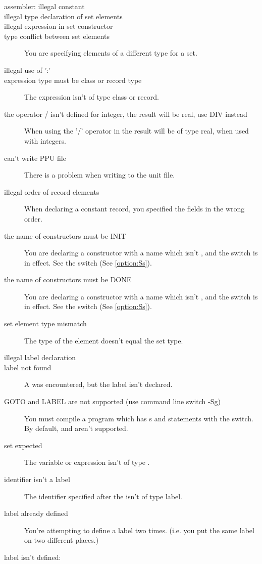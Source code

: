 \documentclass{report}
\newcommand{\seeo}[1]{See \ref{option:#1}}
\begin{document}
\begin{description}
\item [assembler: illegal constant]
\item [illegal type declaration of set elements]
\item [illegal expression in set constructor]
\item [type conflict between set elements]
You are specifying elements of a different type for a set.
\item [illegal use of ':']
\item [expression type must be class or record type]
The expression isn't of type class or record.
\item [the operator / isn't defined for integer, the result will be real, use DIV instead]
When using the '/' operator in \fpk the result will be of type real, when
used with integers.
\item [can't write PPU file]
There is a problem when writing to the unit file.
\item [illegal order of record elements]
When declaring a constant record, you specified the fields in the wrong
order.
\item [the name of constructors must be INIT]
You are declaring a constructor with a name which isn't , and the
 switch is in effect. See the  switch (\seeo{Ss}). 
\item [the name of constructors must be DONE]
You are declaring a constructor with a name which isn't , and the
 switch is in effect. See the  switch (\seeo{Ss}). 
\item [set element type mismatch]
The type of the element doesn't equal the set type.
\item [illegal label declaration]
\item [label not found]
A  was encountered, but the label isn't declared. 
\item [GOTO and LABEL are not supported (use command line switch -Sg)]
You must compile a program which has s and  statements 
with the   switch. By default,  and  aren't
supported.
\item [set expected]
The variable or expression isn't of type .
\item [identifier isn't a label]
The identifier specified after the  isn't of type label.
\item [label already defined]
You're attempting to define a label two times. (i.e. you put the same label
on two different places.)
\item [label isn't defined:]

\end{description}
\end{document}
